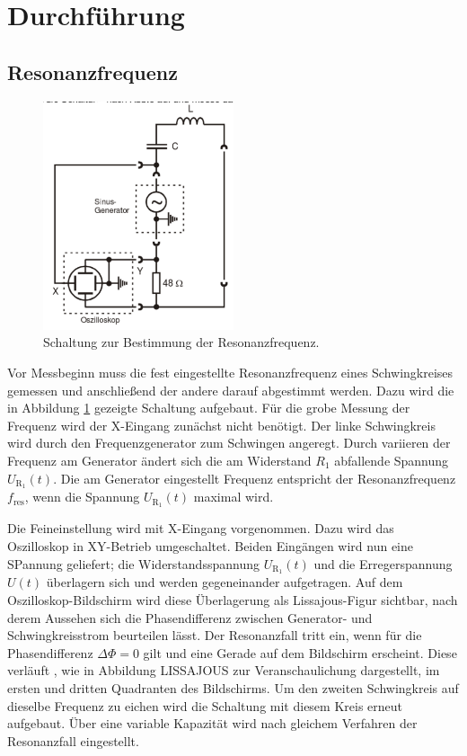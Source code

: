 \section{Durchführung}
\label{sec:Durchfuehrung}
\subsection{Resonanzfrequenz}
\label{sec:Resonanzfrequenz}


\begin{figure}[h]
	\centering
	\label{fig:resonanzfrequenz}
		\includegraphics[width=0.5\textwidth]{Bilder/Resonanzfrequenz.pdf}
		\caption{Schaltung zur Bestimmung der Resonanzfrequenz.}
\end{figure}
Vor Messbeginn muss die fest eingestellte Resonanzfrequenz eines Schwingkreises gemessen und anschließend der andere darauf abgestimmt werden. Dazu wird die in Abbildung \ref{fig:resonanzfrequenz} gezeigte Schaltung aufgebaut. Für die grobe Messung der Frequenz wird der X-Eingang zunächst nicht benötigt. Der linke Schwingkreis wird durch den Frequenzgenerator zum Schwingen angeregt. Durch variieren der Frequenz am Generator ändert sich die am Widerstand $R_1$ abfallende Spannung $U_\mathup{R_1}(t)$. Die am Generator eingestellt Frequenz entspricht der Resonanzfrequenz $f_\mathup{res}$, wenn die Spannung $U_\mathup{R_1}(t)$ maximal wird.

Die Feineinstellung wird mit X-Eingang vorgenommen.
Dazu wird das Oszilloskop in XY-Betrieb umgeschaltet. Beiden Eingängen wird nun eine SPannung geliefert; die Widerstandsspannung $U_\mathup{R_1}(t)$ und die Erregerspannung $U(t)$ überlagern sich und werden gegeneinander aufgetragen. Auf dem Oszilloskop-Bildschirm wird diese Überlagerung als Lissajous-Figur sichtbar, nach derem Aussehen sich die Phasendifferenz zwischen Generator- und Schwingkreisstrom beurteilen lässt. 
Der Resonanzfall tritt ein, wenn für die Phasendifferenz $\Delta{\Phi}=0$  gilt und eine Gerade auf dem Bildschirm erscheint. Diese verläuft , wie in Abbildung LISSAJOUS zur Veranschaulichung dargestellt, im ersten und dritten Quadranten des Bildschirms.
Um den zweiten Schwingkreis auf dieselbe Frequenz zu eichen wird die Schaltung mit diesem Kreis erneut aufgebaut. Über eine variable Kapazität wird nach gleichem Verfahren der Resonanzfall eingestellt.

